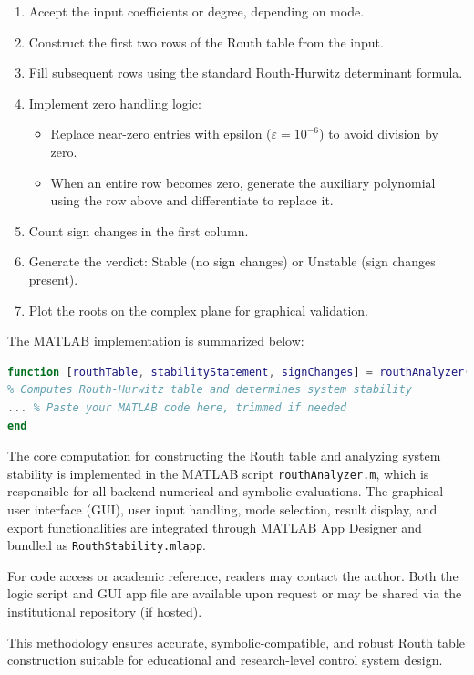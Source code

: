 \documentclass[11pt]{article}
\begin{document}
\begin{enumerate}
    \item Accept the input coefficients or degree, depending on mode.
    \item Construct the first two rows of the Routh table from the input.
    \item Fill subsequent rows using the standard Routh-Hurwitz determinant formula.
    \item Implement zero handling logic:
    \begin{itemize}
        \item Replace near-zero entries with epsilon ($\varepsilon = 10^{-6}$) to avoid division by zero.
        \item When an entire row becomes zero, generate the auxiliary polynomial using the row above and differentiate to replace it.
    \end{itemize}
    \item Count sign changes in the first column.
    \item Generate the verdict: Stable (no sign changes) or Unstable (sign changes present).
    \item Plot the roots on the complex plane for graphical validation.
\end{enumerate}

The MATLAB implementation is summarized below:

\begin{lstlisting}[language=Matlab, caption=routhAnalyzer.m -- Core Logic]
function [routhTable, stabilityStatement, signChanges] = routhAnalyzer(coeffs)
% Computes Routh-Hurwitz table and determines system stability
... % Paste your MATLAB code here, trimmed if needed
end
\end{lstlisting}
The core computation for constructing the Routh table and analyzing system stability is implemented in the MATLAB script \texttt{routhAnalyzer.m}, which is responsible for all backend numerical and symbolic evaluations. The graphical user interface (GUI), user input handling, mode selection, result display, and export functionalities are integrated through MATLAB App Designer and bundled as \texttt{RouthStability.mlapp}.

For code access or academic reference, readers may contact the author. Both the logic script and GUI app file are available upon request or may be shared via the institutional repository (if hosted).


This methodology ensures accurate, symbolic-compatible, and robust Routh table construction suitable for educational and research-level control system design.
\end{document}
